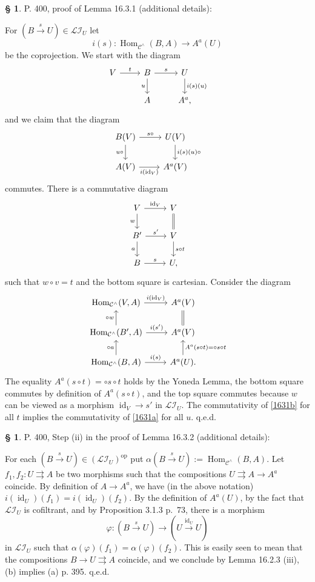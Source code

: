 \documentclass[12pt]{article}
\theoremstyle{remark}
\theoremstyle{definition}
\newtheorem{s}[thm]{\S}
\newcommand{\cc}{\mathcal}
\newcommand{\C}{\mathcal C}
\newcommand{\mc}{\mathcal}
\newcommand{\parar}{\rightrightarrows}\newcommand{\paralelarrows}{\rightrightarrows}%
\newcommand{\xr}{\xrightarrow}
\DeclareMathOperator{\id}{id}
\DeclareMathOperator{\Hom}{Hom}%
\DeclareMathOperator{\op}{op}
\begin{document}
\begin{s} 
P. 400, proof of Lemma 16.3.1 (additional details): 

For $(B\xr s U)\in\mc{LI}_U$ let 
$$
i(s):\Hom_{\C^\wedge}(B,A)\to A^a(U)
$$ 
be the coprojection. We start with the diagram 
$$
\begin{tikzcd}
%
V\ar{r}{t}&B\ar{d}[swap]{u}\ar{r}{s}&U\ar{d}{i(s)(u)}\\ 
{}&A&A^a,
%
\end{tikzcd}
$$ 
and we claim that the diagram 
\begin{equation}\label{1631a}
\begin{tikzcd}
%
B(V)\ar{d}[swap]{u\circ}\ar{r}{s\circ}&U(V)\ar{d}{i(s)(u)\circ}\\ 
A(V)\ar{r}[swap]{i(\id_V)}&A^a(V)
%
\end{tikzcd}
\end{equation} 
commutes. There is a commutative diagram 
$$
\begin{tikzcd}
%
V\ar{d}[swap]{w}\ar{r}{\id_V}&V\ar[equal]{d}\\ 
B'\ar{d}[swap]{a}\ar{r}{s'}&V\ar{d}{s\circ t}\\ 
B\ar{r}{s}&U,
%
\end{tikzcd}
$$ 
such that $w\circ v=t$ and the bottom square is cartesian. Consider the diagram 
%
\begin{equation}\label{1631b}
\begin{tikzcd}
%
\Hom_{\C^\wedge}(V,A)\ar{r}{i(\id_V)}&A^a(V)\ar[equal]{d}\\ 
\Hom_{\C^\wedge}(B',A)\ar{u}{\circ w}\ar{r}{i(s')}&A^a(V)\\ 
\Hom_{\C^\wedge}(B,A)\ar{u}{\circ a}\ar{r}{i(s)}&A^a(U)\ar{u}[swap]{A^a(s\circ t)=\circ s\circ t}.
%
\end{tikzcd}
\end{equation}
%
The equality $A^a(s\circ t)=\circ s\circ t$ holds by the Yoneda Lemma, the bottom square commutes by definition of $A^a(s\circ t)$, and the top square commutes because $w$ can be viewed as a morphism $\id_V\to s'$ in $\mc{LI}_U$. The commutativity of \eqref{1631b} for all $t$ implies the commutativity of \eqref{1631a} for all $u$. q.e.d.
\end{s}
%
%
\begin{s} 
P. 400, Step (ii) in the proof of Lemma 16.3.2 (additional details):

For each $(B\xr sU)\in(\cc{LI}_U)^{\op}$ put $\alpha(B\xr sU):=\Hom_{\C^\wedge}(B,A)$. Let $f_1,f_2:U\parar A$ be two morphisms such that the compositions $U\parar A\to A^a$ coincide. By definition of $A\to A^a$, we have (in the above notation) $i(\id_U)(f_1)=i(\id_U)(f_2)$. By the definition of $A^a(U)$, by the fact that $\cc{LI}_U$ is cofiltrant, and by Proposition 3.1.3 p.~73, there is a morphism 
$$
\varphi:(B\xr sU)\to(U\xr{\id_U}U)
$$ 
in $\cc{LI}_U$ such that $\alpha(\varphi)(f_1)=\alpha(\varphi)(f_2)$. This is easily seen to mean that the compositions $B\to U\parar A$ coincide, and we conclude by Lemma 16.2.3 (iii), (b) implies (a) p. 395. q.e.d.
\end{s}
\end{document}
